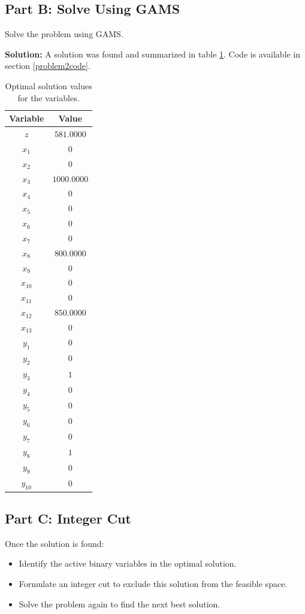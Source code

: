 \documentclass[11pt]{article}
\begin{document}
\subsection{Part B: Solve Using GAMS}
Solve the problem using GAMS.

\textbf{Solution:}
A solution was found and summarized in table \ref{tab:optimal_solution}. 
Code is available in section \ref{problem2code}.
\begin{table}[htbp]
\centering
\begin{tabular}{|c|c|}
\hline
\textbf{Variable} & \textbf{Value} \\ \hline
$z$ & $581.0000$ \\ \hline
$x_1$ & $0$ \\ \hline
$x_2$ & $0$ \\ \hline
$x_3$ & $1000.0000$ \\ \hline
$x_4$ & $0$ \\ \hline
$x_5$ & $0$ \\ \hline
$x_6$ & $0$ \\ \hline
$x_7$ & $0$ \\ \hline
$x_8$ & $800.0000$ \\ \hline
$x_9$ & $0$ \\ \hline
$x_{10}$ & $0$ \\ \hline
$x_{11}$ & $0$ \\ \hline
$x_{12}$ & $850.0000$ \\ \hline
$x_{13}$ & $0$ \\ \hline
$y_1$ & $0$ \\ \hline
$y_2$ & $0$ \\ \hline
$y_3$ & $1$ \\ \hline
$y_4$ & $0$ \\ \hline
$y_5$ & $0$ \\ \hline
$y_6$ & $0$ \\ \hline
$y_7$ & $0$ \\ \hline
$y_8$ & $1$ \\ \hline
$y_9$ & $0$ \\ \hline
$y_{10}$ & $0$ \\ \hline
\end{tabular}
\caption{Optimal solution values for the variables.}
\label{tab:optimal_solution}
\end{table}

\subsection{Part C: Integer Cut}
Once the solution is found:
\begin{itemize}
  \item Identify the active binary variables in the optimal solution.
  \item Formulate an integer cut to exclude this solution from the feasible space.
  \item Solve the problem again to find the next best solution.
\end{itemize}
\end{document}
